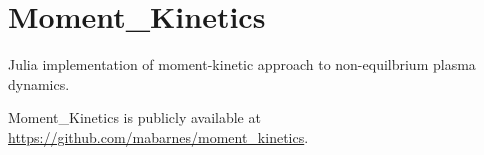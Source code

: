 \section{Moment\_Kinetics}
Julia implementation of moment-kinetic approach to non-equilbrium plasma dynamics.

Moment\_Kinetics is publicly available at \url{https://github.com/mabarnes/moment_kinetics}.
